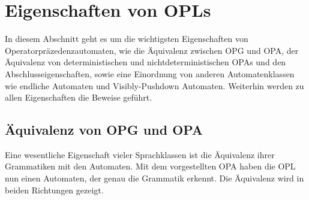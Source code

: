 \section{Eigenschaften von OPLs}
In diesem Abschnitt geht es um die wichtigsten Eigenschaften von Operatorpräzedenzautomaten, wie die Äquivalenz zwischen OPG und OPA, der Äquivalenz von deterministischen und nichtdeterministischen OPAs und den Abschlusseigenschaften, sowie eine Einordnung von anderen Automatenklassen wie endliche Automaten und Visibly-Pushdown Automaten. Weiterhin werden zu allen Eigenschaften die Beweise geführt.
\subsection{Äquivalenz von OPG und OPA}
Eine wesentliche Eigenschaft vieler Sprachklassen ist die Äquivalenz ihrer Grammatiken mit den Automaten. Mit dem vorgestellten OPA haben die OPL nun einen Automaten, der genau die Grammatik erkennt. Die Äquivalenz wird in beiden Richtungen gezeigt. \cite{mso, precedence_automata}


